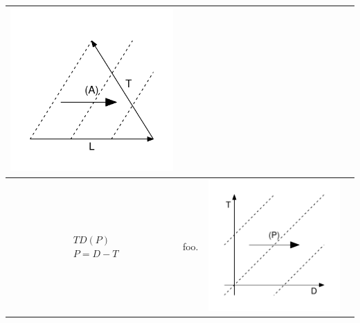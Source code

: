\documentclass[
  12pt
]{scrartcl}
\begin{document}
\begin{center}
\begin{longtable}{m{}m{}m{}m{}}
  \includegraphics[width = \linewidth]{../fig/TLa_iso.pdf}  \\
  \midrule
  $$\begin{aligned}
    &TD(P) \\
    &P = D - T
  \end{aligned}$$ &
  foo. &
  \includegraphics[width = \linewidth]{../fig/TDp.pdf} &

\end{longtable}
\end{center}
\end{document}

